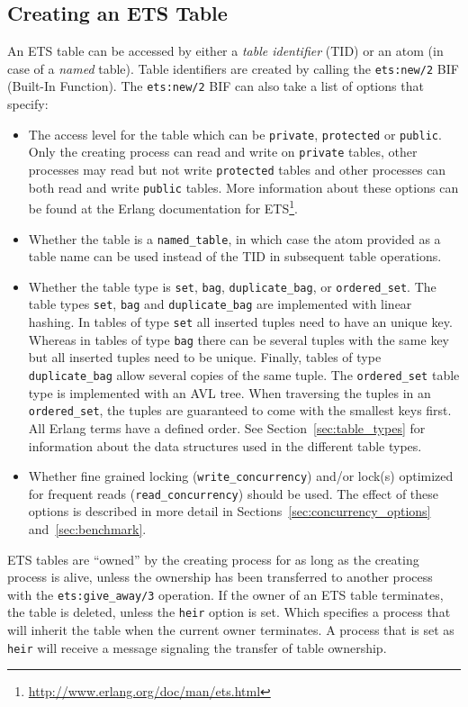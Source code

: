 \documentclass[aps,pre,preprint,nofootinbib]{revtex4}
\begin{document}
\subsection{Creating an ETS Table}

An ETS table can be accessed by either a \emph{table identifier} (TID) or an atom (in case of a \emph{named} table).
Table identifiers are created by calling the \verb|ets:new/2| BIF (Built-In Function).
The \verb|ets:new/2| BIF can also take a list of options that specify:

\begin{itemize}
\item
  The access level for the table which can be \verb|private|, \verb|protected| or \verb|public|.
  Only the creating process can read and write on \verb|private| tables, other processes may read but not write \verb|protected| tables and other processes can both read and write \verb|public| tables.
  More information about these options can be found at the Erlang documentation for ETS\footnote{\url{http://www.erlang.org/doc/man/ets.html}}.
\item
  Whether the table is a \verb|named_table|, in which case the atom provided as a table name can be used instead of the TID in subsequent table operations.
\item
  Whether the table type is \verb|set|, \verb|bag|, \verb|duplicate_bag|, or \verb|ordered_set|.
  The table types \verb|set|, \verb|bag| and \verb|duplicate_bag| are implemented with linear hashing.
  In tables of type \verb|set| all inserted tuples need to have an unique key.
  Whereas in tables of type \verb|bag| there can be several tuples with the same key but all inserted tuples need to be unique.
  Finally, tables of type \verb|duplicate_bag| allow several copies of the same tuple.
  The \verb|ordered_set| table type is implemented with an AVL tree.
  When traversing the tuples in an \verb|ordered_set|, the tuples are guaranteed to come with the smallest keys first. 
  All Erlang terms have a defined order.
  See Section~\ref{sec:table_types} for information about the data structures used in the different table types.
\item
  Whether fine grained locking (\verb|write_concurrency|) and/or lock(s) optimized for frequent reads (\verb|read_concurrency|) should be used.
  The effect of these options is described in more detail in Sections~\ref{sec:concurrency_options} and~\ref{sec:benchmark}.
\end{itemize}

ETS tables are ``owned'' by the creating process for as long as the creating process is alive, unless the ownership has been transferred to another process with the \verb|ets:give_away/3| operation.
If the owner of an ETS table terminates, the table is deleted, unless the \verb|heir| option is set.
Which specifies a process that will inherit the table when the current owner terminates.
A process that is set as \verb|heir| will receive a message signaling the transfer of table ownership.
\end{document}
